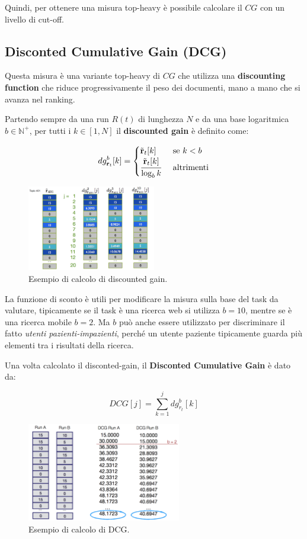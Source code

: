 Quindi, per ottenere una misura top-heavy è possibile calcolare il $CG$ con un livello di cut-off.

\subsection{Disconted Cumulative Gain (DCG)}

Questa misura è una variante top-heavy di $CG$ che utilizza una \textbf{discounting function} che riduce progressivamente il peso dei documenti, mano a mano che si avanza nel ranking.

Partendo sempre da una run $R(t)$ di lunghezza $N$ e da una base logaritmica $b \in \mathbb{N}^+$, per tutti i $k \in [1,N]$ il \textbf{discounted gain} è definito come:

$$
dg_{\mathbf{r}_t}^b[k] = \begin{cases}
\tilde{\mathbf{r}}_t[k] \quad &\text{se } k < b \\
\cfrac{\tilde{\mathbf{r}}_t[k]}{\log_b k} &\text{altrimenti}
\end{cases}
$$

\begin{figure}[htbp]
	\centering
	\includegraphics[width=0.5\textwidth]{images/l16-fig-4.png}
	\caption{Esempio di calcolo di discounted gain.}
\end{figure}

La funzione di sconto è utili per modificare la misura sulla base del task da valutare, tipicamente se il task è una ricerca web si utilizza $b=10$, mentre se è una ricerca mobile $b=2$.
Ma $b$ può anche essere utilizzato per discriminare il fatto \textit{utenti pazienti-impazienti}, perché un utente paziente tipicamente guarda più elementi tra i risultati della ricerca.

Una volta calcolato il disconted-gain, il \textbf{Disconted Cumulative Gain} è dato da:

$$
DCG[j] = \sum\limits_{k=1}^{j}dg_{r_t}^b[k]
$$


\begin{figure}[htbp]
	\centering
	\includegraphics[width=0.6\textwidth]{images/l16-fig-5.png}
	\caption{Esempio di calcolo di DCG.}
\end{figure}

